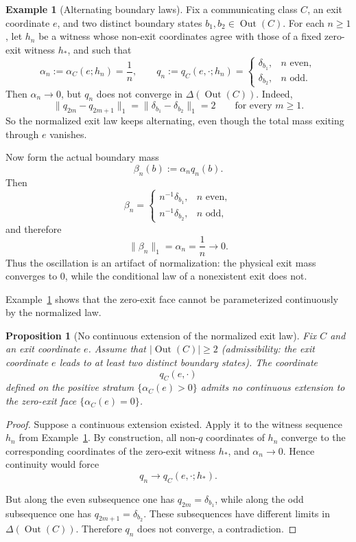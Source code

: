 \documentclass[12pt,a4paper]{article}
\newtheorem{proposition}[theorem]{Proposition}
\theoremstyle{definition}
\newtheorem{example}[theorem]{Example}
\DeclareMathOperator{\Out}{Out}
\begin{document}
\begin{example}[Alternating boundary laws]\label{ex:alternating-boundary-laws}
Fix a communicating class $C$, an exit coordinate $e$, and two distinct boundary states $b_1,b_2\in \Out(C)$. For each $n\ge 1$, let $h_n$ be a witness whose non-exit coordinates agree with those of a fixed zero-exit witness $h_\ast$, and such that
\[
\alpha_n:=\alpha_C(e;h_n)=\frac{1}{n},
\qquad
q_n:=q_C(e,\cdot;h_n)=
\begin{cases}
\delta_{b_1}, & n \text{ even},\\[2mm]
\delta_{b_2}, & n \text{ odd}.
\end{cases}
\]
Then $\alpha_n\to 0$, but $q_n$ does not converge in $\Delta(\Out(C))$. Indeed,
\[
\|q_{2m}-q_{2m+1}\|_1
=
\|\delta_{b_1}-\delta_{b_2}\|_1
=
2
\qquad\text{for every }m\ge 1.
\]
So the normalized exit law keeps alternating, even though the total mass exiting through $e$ vanishes.

Now form the actual boundary mass
\[
\beta_n(b):=\alpha_n q_n(b).
\]
Then
\[
\beta_n=
\begin{cases}
n^{-1}\delta_{b_1}, & n \text{ even},\\[2mm]
n^{-1}\delta_{b_2}, & n \text{ odd},
\end{cases}
\]
and therefore
\[
\|\beta_n\|_1=\alpha_n=\frac1n\longrightarrow 0.
\]
Thus the oscillation is an artifact of normalization: the physical exit mass converges to $0$, while the conditional law of a nonexistent exit does not.
\end{example}

Example~\ref{ex:alternating-boundary-laws} shows that the zero-exit face cannot be parameterized continuously by the normalized law.

\begin{proposition}[No continuous extension of the normalized exit law]\label{prop:q-discontinuous}
Fix $C$ and an exit coordinate $e$.  Assume that $|\Out(C)| \geq 2$ (admissibility: the exit coordinate $e$ leads to at least two distinct boundary states).  The coordinate
\[
q_C(e,\cdot)
\]
defined on the positive stratum $\{\alpha_C(e)>0\}$ admits no continuous extension to the zero-exit face $\{\alpha_C(e)=0\}$.
\end{proposition}

\begin{proof}
Suppose a continuous extension existed. Apply it to the witness sequence $h_n$ from Example~\ref{ex:alternating-boundary-laws}. By construction, all non-$q$ coordinates of $h_n$ converge to the corresponding coordinates of the zero-exit witness $h_\ast$, and $\alpha_n\to 0$. Hence continuity would force
\[
q_n \longrightarrow q_C(e,\cdot;h_\ast).
\]

But along the even subsequence one has $q_{2m}=\delta_{b_1}$, while along the odd subsequence one has $q_{2m+1}=\delta_{b_2}$. These subsequences have different limits in $\Delta(\Out(C))$. Therefore $q_n$ does not converge, a contradiction.
\end{proof}
\end{document}
